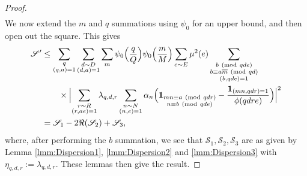 \documentclass[10pt]{amsart}
\theoremstyle{plain}
\numberwithin{equation}{section}
\newcommand{\Mod}[1]{\ (\mathrm{mod}\ #1)}
\begin{document}
\begin{proof}
\begin{align*}
\end{align*}
We now extend the $m$ and $q$ summations using $\psi_0$ for an upper bound, and then open out the square. This gives
\begin{align}
\mathscr{S}'&\le \sum_{\substack{q\\ (q,a)=1}}\sum_{\substack{d\sim D\\ (d,a)=1}}\sum_m \psi_0\Bigl(\frac{q}{Q}\Bigr)\psi_0\Bigl(\frac{m}{M}\Bigr)\sum_{e\sim E}\mu^2(e)\sum_{\substack{b\Mod{q d e}\\ b\equiv a\overline{m}\Mod{q d}\\ (b,q d e )=1}}\nonumber\\
&\qquad\times \Bigl|\sum_{\substack{r\sim R\\ (r,a e)=1}}\lambda_{q,d,r}\sum_{\substack{n\sim N\\ (n,e)=1}}\alpha_n\Bigl(\mathbf{1}_{\substack{m n\equiv a\Mod{q d r}\\ n\equiv b\Mod{q d e}}}-\frac{\mathbf{1}_{(m n,qd r)=1}}{\phi(q d r e)}\Bigr)\Bigr|^2\nonumber \\
&=  \mathscr{S}_{1}-2\Re(\mathscr{S}_{2})+\mathscr{S}_{3},\label{eq:S1Expansion}
\end{align}
where, after performing the $b$ summation, we see that $\mathscr{S}_1,\mathscr{S}_2,\mathscr{S}_3$ are as given by Lemma \ref{lmm:Dispersion1}, \ref{lmm:Dispersion2} and \ref{lmm:Dispersion3} with $\eta_{q,d,r}:=\lambda_{q,d,r}$. These lemmas then give the result.
\end{proof}
%
%
%
%
%
%
%
%
\end{document}
